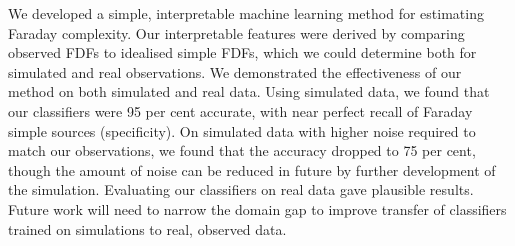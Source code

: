   We developed a simple, interpretable machine learning method for estimating Faraday complexity. Our interpretable features were derived by comparing observed FDFs to idealised simple FDFs, which we could determine both for simulated and real observations. We demonstrated the effectiveness of our method on both simulated and real data. Using simulated data, we found that our classifiers were 95 per cent accurate, with near perfect recall of Faraday simple sources (specificity). On simulated data with higher noise required to match our observations, we found that the accuracy dropped to 75 per cent, though the amount of noise can be reduced in future by further development of the simulation. Evaluating our classifiers on real data gave plausible results. Future work will need to narrow the domain gap to improve transfer of classifiers trained on simulations to real, observed data.



